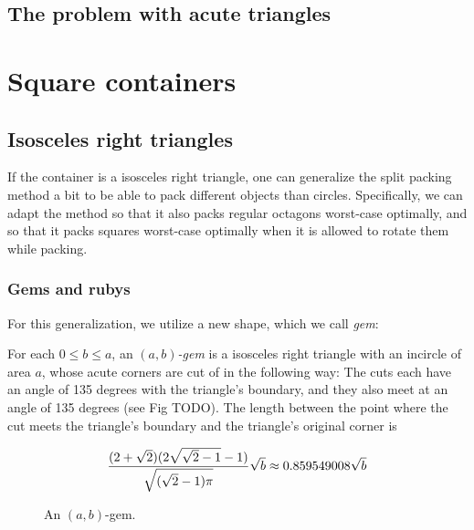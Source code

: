 \section{The problem with acute triangles}

\chapter{Square containers}

\section{Isosceles right triangles}

If the container is a isosceles right triangle, one can generalize the split packing method a bit to be able to pack different objects than circles. Specifically, we can adapt the method so that it also packs regular octagons worst-case optimally, and so that it packs squares worst-case optimally when it is allowed to rotate them while packing.

\subsection{Gems and rubys}

For this generalization, we utilize a new shape, which we call \emph{gem}:

\begin{definition}
    For each $0 \le b \le a$, an \emph{$(a,b)$-gem} is a isosceles right triangle with an incircle of area $a$, whose acute corners are cut of in the following way: The cuts each have an angle of 135 degrees with the triangle's boundary, and they also meet at an angle of 135 degrees (see Fig TODO). The length between the point where the cut meets the triangle's boundary and the triangle's original corner is

    $$\frac{(2+\sqrt{2})(2\sqrt{\sqrt{2}-1}-1)}{\sqrt{(\sqrt{2}-1)\pi}}\sqrt{b} \approx 0.859549008 \sqrt{b}$$
\end{definition}

\begin{figure}[htbp!]
    \centering


    \caption{An $(a,b)$-gem.}
    \label{fig:hat}
\end{figure}

